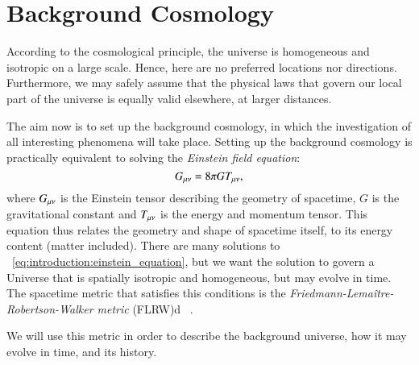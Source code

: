 \section{Background Cosmology}\label{sec:m1}

According to the cosmological principle, the universe is homogeneous and isotropic on a large scale. Hence, here are no preferred locations nor directions. Furthermore, we may safely assume that the physical laws that govern our local part of the universe is equally valid elsewhere, at larger distances. 

The aim now is to set up the background cosmology, in which the investigation of all interesting phenomena will take place. Setting up the background cosmology is practically equivalent to solving the \textit{Einstein field equation}:
\begin{equation}\label{eq:introduction:einstein_equation}
    G_{\mu\nu} = 8\pi GT_{\mu\nu},
\end{equation}
where $G_{\mu\nu}$ is the Einstein tensor describing the geometry of spacetime, $G$ is the gravitational constant and $T_{\mu\nu}$ is the energy and momentum tensor. This equation thus relates the geometry and shape of spacetime itself, to its energy content (matter included). There are many solutions to ~\cref{eq:introduction:einstein_equation}, but we want the solution to govern a Universe that is spatially isotropic and homogeneous, but may evolve in time. The spacetime metric that satisfies this conditions is the \textit{Friedmann-Lemaître-Robertson-Walker metric} (FLRW)d ~\cite[ch. 8]{carroll_2019}.

We will use this metric in order to describe the background universe, how it may evolve in time, and its history. 



